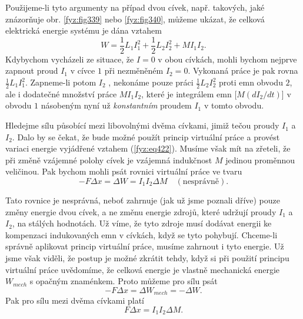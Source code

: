 {  Použijeme-li tyto argumenty na případ dvou cívek, např. takových, jaké znázorňuje obr. 
  \ref{fyz:fig339} nebo \ref{fyz:fig340}, můžeme ukázat, že celková elektrická energie systému je 
  dána vztahem
  \begin{equation}\label{fyz:eq422}
    W = \frac{1}{2}L_1I_1^2 + \frac{1}{2}L_2I_2^2 + MI_1I_2.
  \end{equation}
  Kdybychom vycházeli ze situace, že \(I = 0\) v obou cívkách, mohli bychom nejprve zapnout proud 
  \(I_1\) v cívce \(1\) při nezměněném \(I_2 = 0\). Vykonaná práce je pak rovna 
  \(\frac{1}{2}L_1I_1^2\). Zapneme-li potom \(I_2\) , nekonáme pouze práci \(\frac{1}{2}L_2I_2^2\) 
  proti emn obvodu \(2\), ale i dodatečné množství práce \(MI_1I_2\), které je integrálem emn 
  [\(M(dI_2/dt)\)] v obvodu \(1\) násobeným nyní už \emph{konstantním} proudem \(I_1\) v tomto 
  obvodu.
  
  Hledejme sílu působící mezi libovolnými dvěma cívkami, jimiž tečou proudy \(I_1\) a \(I_2\). Dalo 
  by se čekat, že bude možné použít princip virtuální práce a provést variaci energie vyjádřené 
  vztahem (\ref{fyz:eq422}). Musíme však mít na zřeteli, že při změně vzájemné polohy cívek je 
  vzájemná indukčnost \(M\) jedinou proměnnou veličinou. Pak bychom mohli psát rovnici virtuální 
  práce ve tvaru
  \begin{equation}\label{fyz:eq423}
    -F\Delta x = \Delta W = I_1I_2\Delta M \quad (\text{nesprávně}).
  \end{equation}

  Tato rovnice je nesprávná, neboť zahrnuje (jak už jsme poznali dříve) pouze změny energie dvou 
  cívek, a ne změnu energie zdrojů, které udržují proudy \(I_1\) a \(I_2\), na stálých hodnotách. 
  Už víme, že tyto zdroje musí dodávat energii ke kompenzaci indukovaných emn v cívkách, když se 
  tyto pohybují. Chceme-li správně aplikovat princip virtuální práce, musíme zahrnout i tyto 
  energie. Už jsme však viděli, že postup je možné zkrátit tehdy, když si při použití principu 
  virtuální práce uvědomíme, že celková energie je vlastně mechanická energie \(W_{mech}\) s 
  opačným znaménkem. Proto můžeme pro sílu psát
  \begin{equation}\label{fyz:eq424}
    -F\Delta x = \Delta W_{mech} = -\Delta W.
  \end{equation}
  Pak pro sílu mezi dvěma cívkami platí
  \begin{equation*}
    F\Delta x = I_1I_2\Delta M.
  \end{equation*}
  
}
